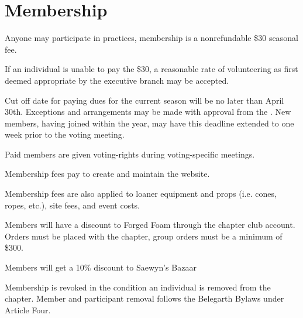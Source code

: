 \documentclass[12pt]{article}
\begin{document}
\section{Membership}
\begin{level}
    \item Anyone may participate in practices, membership is a nonrefundable \$30 seasonal fee.
    \begin{level}
        \item If an individual is unable to pay the \$30, a reasonable rate of volunteering as first deemed appropriate by the executive branch may be accepted.
        \item Cut off date for paying dues for the current season will be no later than April 30th. Exceptions and arrangements may be made with approval from the . New members, having joined within the year, may have this deadline extended to one week prior to the voting meeting.
    \end{level}
    \item Paid members are given voting-rights during voting-specific meetings.
    \item Membership fees pay to create and maintain the website.
    \item Membership fees are also applied to loaner equipment and props (i.e. cones, ropes, etc.), site fees, and event costs.
    \item Members will have a discount to Forged Foam through the chapter club account. Orders must be placed with the chapter, group orders must be a minimum of \$300.
    \item Members will get a 10\% discount to Saewyn's Bazaar
    \item Membership is revoked in the condition an individual is removed from the chapter. Member and participant removal follows the Belegarth Bylaws under Article Four.
\end{level}
\end{document}
